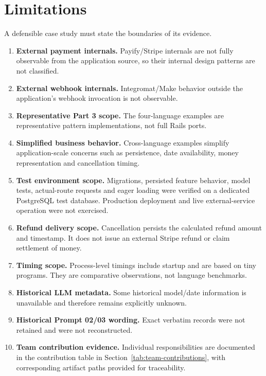 \documentclass[10pt,a4paper]{article}
\begin{document}
\section{Limitations}

A defensible case study must state the boundaries of its evidence.

\begin{enumerate}[leftmargin=*]
\item \textbf{External payment internals.} Payify/Stripe internals are not fully observable from the application source, so their internal design patterns are not classified.
\item \textbf{External webhook internals.} Integromat/Make behavior outside the application's webhook invocation is not observable.
\item \textbf{Representative Part 3 scope.} The four-language examples are representative pattern implementations, not full Rails ports.
\item \textbf{Simplified business behavior.} Cross-language examples simplify application-scale concerns such as persistence, date availability, money representation and cancellation timing.
\item \textbf{Test environment scope.} Migrations, persisted feature behavior, model tests, actual-route requests and eager loading were verified on a dedicated PostgreSQL test database. Production deployment and live external-service operation were not exercised.
\item \textbf{Refund delivery scope.} Cancellation persists the calculated refund amount and timestamp. It does not issue an external Stripe refund or claim settlement of money.
\item \textbf{Timing scope.} Process-level timings include startup and are based on tiny programs. They are comparative observations, not language benchmarks.
\item \textbf{Historical LLM metadata.} Some historical model/date information is unavailable and therefore remains explicitly unknown.
\item \textbf{Historical Prompt 02/03 wording.} Exact verbatim records were not retained and were not reconstructed.
\item \textbf{Team contribution evidence.} Individual responsibilities are documented in the contribution table in Section~\ref{tab:team-contributions}, with corresponding artifact paths provided for traceability.
\end{enumerate}
\end{document}
